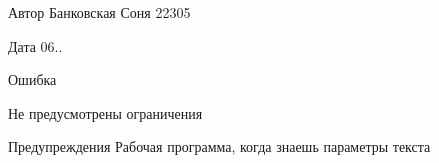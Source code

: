 \begin{DoxyAuthor}{Автор}
Банковская Соня 22305 
\end{DoxyAuthor}
\begin{DoxyDate}{Дата}
06.. 
\end{DoxyDate}
\begin{DoxyRefDesc}{Ошибка}
\item[\mbox{\hyperlink{bug__bug000004}{Ошибка}}]Не предусмотрены ограничения \end{DoxyRefDesc}
\begin{DoxyWarning}{Предупреждения}
Рабочая программа, когда знаешь параметры текста 
\end{DoxyWarning}
